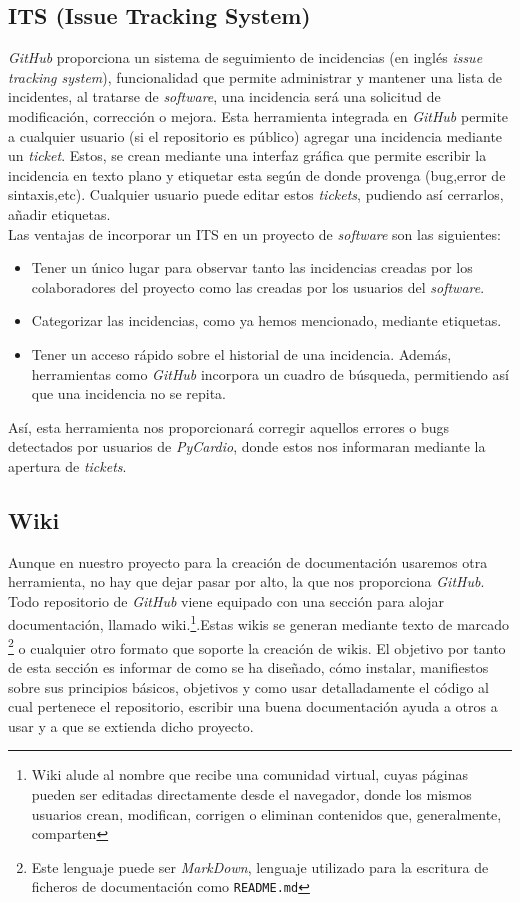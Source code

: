 \subsection{ITS (Issue Tracking System)}
\label{subsec:issue}
\emph{GitHub} proporciona un sistema de seguimiento de incidencias (en inglés \textit{issue tracking system}), funcionalidad que permite administrar y mantener una lista de incidentes, al tratarse de \emph{software}, una incidencia será una solicitud de modificación, corrección o mejora. Esta herramienta integrada en \emph{GitHub} permite a cualquier usuario (si el repositorio es público) agregar una incidencia mediante un \emph{ticket}. Estos, se crean mediante una interfaz gráfica que permite escribir la incidencia en texto plano y etiquetar esta según de donde provenga (bug,error de sintaxis,etc). Cualquier usuario puede editar estos \emph{tickets}, pudiendo así cerrarlos, añadir etiquetas. \\
Las ventajas de incorporar un ITS  en un proyecto de \emph{software} son las siguientes:
\begin{itemize}
    \item Tener un único lugar para observar tanto las incidencias creadas por los colaboradores del proyecto como las creadas por los usuarios del \emph{software}.
    \item Categorizar las incidencias, como ya hemos mencionado, mediante etiquetas.
    \item Tener un acceso rápido sobre el historial de una incidencia. Además, herramientas como \emph{GitHub} incorpora un cuadro de búsqueda, permitiendo así que una incidencia no se repita.
\end{itemize}
Así, esta herramienta nos proporcionará corregir aquellos errores o bugs detectados por usuarios de \emph{PyCardio}, donde estos nos informaran mediante la apertura de \emph{tickets}.

\subsection{Wiki}
\label{subsec:wiki}
Aunque en nuestro proyecto para la creación de documentación usaremos otra herramienta, no hay que dejar pasar por alto, la que nos proporciona \emph{GitHub}.\\
Todo repositorio de \emph{GitHub} viene equipado con una sección para alojar documentación, llamado wiki.\footnote{Wiki alude al nombre que recibe una comunidad virtual, cuyas páginas pueden ser editadas directamente desde el navegador, donde los mismos usuarios crean, modifican, corrigen o eliminan contenidos que, generalmente, comparten}.Estas wikis se generan mediante texto de marcado \footnote{Este lenguaje puede ser \emph{MarkDown}, lenguaje utilizado para la escritura de ficheros de documentación como \texttt{README.md}} o cualquier otro formato que soporte la creación de wikis. El objetivo por tanto de esta sección es informar de como se ha diseñado, cómo instalar, manifiestos sobre sus principios básicos, objetivos y como usar detalladamente el código al cual pertenece el repositorio, escribir una buena documentación ayuda a otros a usar y a que se extienda dicho proyecto.

